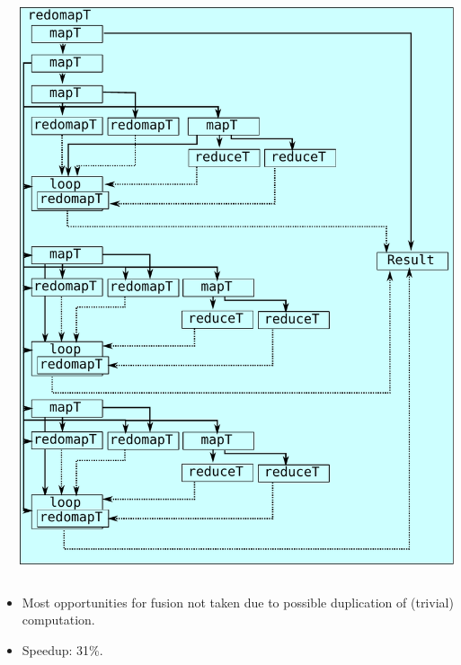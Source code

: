 \documentclass[rgb,dvipsnames]{beamer}
\begin{document}
\begin{frame}
\begin{columns}
\begin{column}{0.4\textwidth}
\end{column}
\begin{column}{0.4\textwidth}
  \includegraphics[width=\textwidth]{img/CalibLexiFi-fused.pdf}
\end{column}
\end{columns}

\begin{itemize}
\item Most opportunities for fusion not taken due to possible
  duplication of (trivial) computation.
\item Speedup: 31\%.
\end{itemize}

\end{frame}
\end{document}
